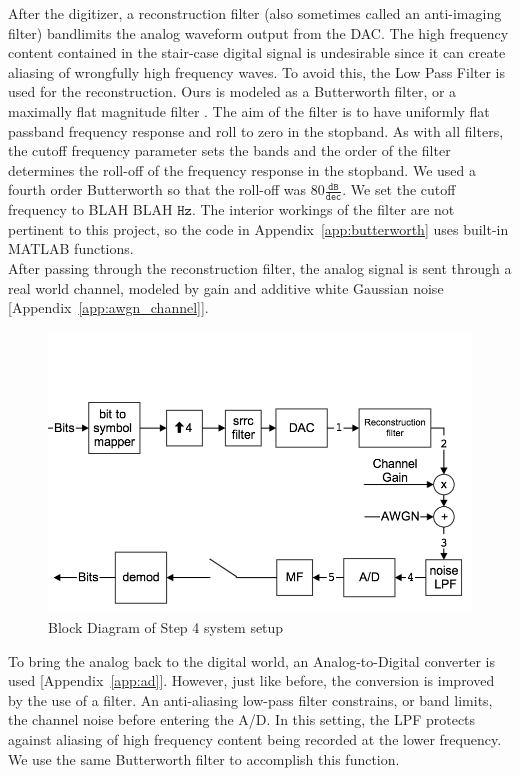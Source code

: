\documentclass[]{article}
\begin{document}
After the digitizer, a reconstruction filter (also sometimes called an anti-imaging filter) bandlimits the analog waveform output from the DAC.  The high frequency content contained in the stair-case digital signal is undesirable since it can create aliasing of wrongfully high frequency waves.  To avoid this, the Low Pass Filter is used for the reconstruction.  Ours is modeled as a Butterworth filter, or a maximally flat magnitude filter \cite{butter}.  The aim of the filter is to have uniformly flat passband frequency response and roll to zero in the stopband.  As with all filters, the cutoff frequency parameter sets the bands and the order of the filter determines the roll-off of the frequency response in the stopband.  We used a fourth order Butterworth so that the roll-off was $80 \mathtt{\frac{dB}{dec}}$.  We set the cutoff frequency to BLAH BLAH $\mathtt{Hz}$. The interior workings of the filter are not pertinent to this project, so the code in Appendix~\ref{app:butterworth} uses built-in MATLAB functions.  \\

After passing through the reconstruction filter, the analog signal is  sent through a real world channel, modeled by gain and additive white Gaussian noise [Appendix~\ref{app:awgn_channel}].\\

\begin{figure}[H]
\centering
\includegraphics[width=\textwidth]{step4.png}
\caption{Block Diagram of Step 4 system setup\label{fig:step4}}
\end{figure}

To bring the analog back to the digital world, an Analog-to-Digital converter is used [Appendix~\ref{app:ad}].  However, just like before, the conversion is improved by the use of a filter.  An anti-aliasing low-pass filter constrains, or band limits, the channel noise before entering the A/D.  In this setting, the LPF protects against aliasing of high frequency content being recorded at the lower frequency.  We use the same Butterworth filter to accomplish this function.\\
\end{document}
